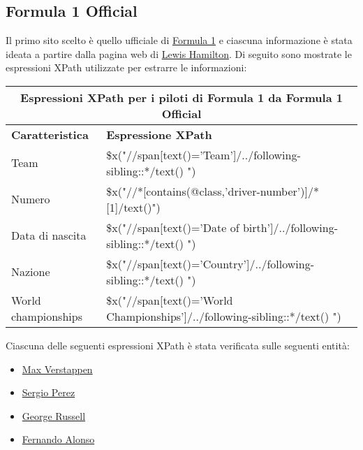 \documentclass[12pt, letterpaper]{article}
\begin{document}
\subsection{Formula 1 Official}
Il primo sito scelto è quello ufficiale di \href{https://www.formula1.com/en.html}{Formula 1} e ciascuna informazione è stata ideata a partire dalla pagina web di \href{https://www.formula1.com/en/drivers/lewis-hamilton.html}{Lewis Hamilton}. Di seguito sono mostrate le espressioni XPath utilizzate per estrarre le informazioni: 
\begin{center}
\begin{table}[!h]
\begin{tabular}{ |p{3cm}|p{9cm}| }
\hline
\multicolumn{2}{|c|}{\textbf{Espressioni XPath per i piloti di Formula 1 da Formula 1 Official}} \\
\hline
 \hline
\textbf{Caratteristica} & \textbf{Espressione XPath} \\[1ex]
 \hline\hline
Team & \$x("//span[text()='Team']/../following-sibling::*/text() ") \\
Numero & \$x("//*[contains(@class,'driver-number')]/*[1]/text()") \\
Data di nascita & \$x("//span[text()='Date of birth']/../following-sibling::*/text() ") \\
Nazione & \$x("//span[text()='Country']/../following-sibling::*/text() ") \\
World championships & \$x("//span[text()='World Championships']/../following-sibling::*/text() ") \\
 \hline
\end{tabular}
\end{table}
\end{center}
Ciascuna delle seguenti espressioni XPath è stata verificata sulle seguenti entità:
\begin{itemize}
    \item \href{https://www.formula1.com/en/drivers/max-verstappen.html}{Max Verstappen}
    \item \href{https://www.formula1.com/en/drivers/sergio-perez.html}{Sergio Perez}
    \item \href{https://www.formula1.com/en/drivers/george-russell.html}{George Russell}
    \item \href{https://www.formula1.com/en/drivers/fernando-alonso.html}{Fernando Alonso}
\end{itemize}
\end{document}
